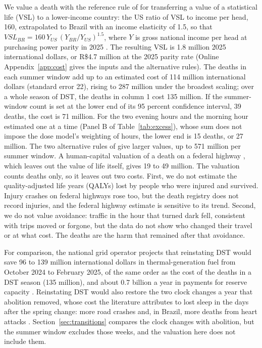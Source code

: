 We value a death with the reference rule of \citet{robinson2019valuing} for transferring a value of a statistical life (VSL) to a lower-income country: the US ratio of VSL to income per head, 160, extrapolated to Brazil with an income elasticity of 1.5, so that $\mathit{VSL}_{\mathit{BR}} = 160\, Y_{\mathit{US}}\, (Y_{\mathit{BR}}/Y_{\mathit{US}})^{1.5}$, where $Y$ is gross national income per head at purchasing power parity in 2025 \citep{worldbank2026wdi}. The resulting VSL is 1.8 million 2025 international dollars, or R\$4.7 million at the 2025 parity rate (Online Appendix~\ref{app:cost} gives the inputs and the alternative rules).  %
The deaths in each summer window add up to an estimated cost of 114 million international dollars (standard error 22), rising to 287 million under the broadest scaling; over a whole season of DST, the deaths in column 1 cost 135 million. If the summer-window count is set at the lower end of its 95 percent confidence interval, 39 deaths, the cost is 71 million. For the two evening hours and the morning hour estimated one at a time (Panel B of Table~\ref{tab:excess}), whose sum does not impose the dose model's weighting of hours, the lower end is 15 deaths, or 27 million. The two alternative rules of \citet{robinson2019valuing} give larger values, up to 571 million per summer window. A human-capital valuation of a death on a federal highway \citep{ipea2015acidentes}, which leaves out the value of life itself, gives 19 to 49 million. The valuation counts deaths only, so it leaves out two costs. First, we do not estimate the quality-adjusted life years (QALYs) lost by people who were injured and survived. Injury crashes on federal highways rose too, but the death registry does not record injuries, and the federal highway estimate is sensitive to its trend. Second, we do not value avoidance: traffic in the hour that turned dark fell, consistent with trips moved or forgone, but the data do not show who changed their travel or at what cost. The deaths are the harm that remained after that avoidance.

For comparison, the national grid operator projects that reinstating DST would save 96 to 139 million international dollars in thermal-generation fuel from October 2024 to February 2025, of the same order as the cost of the deaths in a DST season (135 million), and about 0.7 billion a year in payments for reserve capacity \citep{ons2024nota}. %
Reinstating DST would also restore the two clock changes a year that abolition removed, whose cost the literature attributes to lost sleep in the days after the spring change: more road crashes \citep{smith2016spring, gillmore2025daylight} and, in Brazil, more deaths from heart attacks \citep{toro2015daylight}. Section~\ref{sec:transitions} compares the clock changes with abolition, but the summer window excludes those weeks, and the valuation here does not include them.

